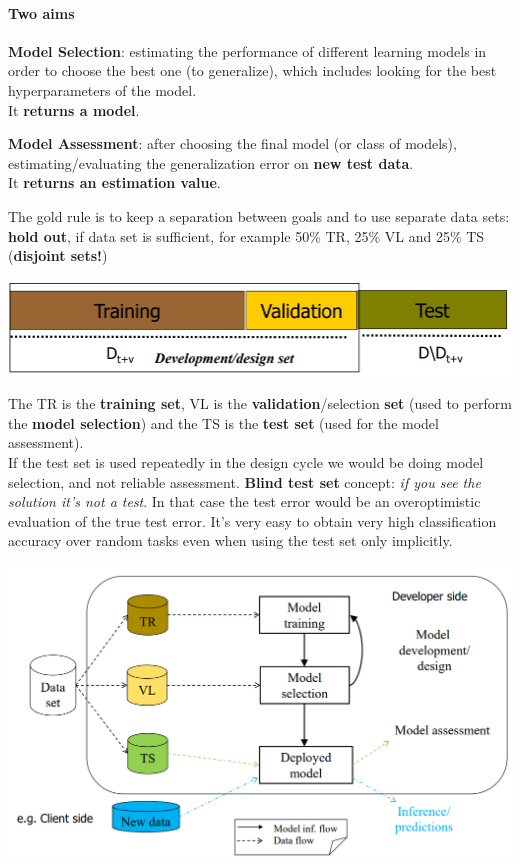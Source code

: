 \documentclass[10pt]{report}
\begin{document}
\paragraph{Two aims} \begin{list}{}{}
	\item \textbf{Model Selection}: estimating the performance of different learning models in order to choose the best one (to generalize), which includes looking for the best hyperparameters of the model.\\
	It \textbf{returns a model}.
	\item \textbf{Model Assessment}: after choosing the final model (or class of models), estimating/evaluating the generalization error on \textbf{new test data}.\\
	It \textbf{returns an estimation value}.
\end{list}
The gold rule is to keep a separation between goals and to use separate data sets: \textbf{hold out}, if data set is sufficient, for example 50\% TR, 25\% VL and 25\% TS (\textbf{disjoint sets!})
	\begin{center}
		\includegraphics[scale=0.5]{11.png}
	\end{center}
The TR is the \textbf{training set}, VL is the \textbf{validation}/selection \textbf{set} (used to perform the \textbf{model selection}) and the TS is the \textbf{test set} (used for the model assessment).\\
If the test set is used repeatedly in the design cycle we would be doing model selection, and not reliable assessment. \textbf{Blind test set} concept: \textit{if you see the solution it's not a test}. In that case the test error would be an overoptimistic evaluation of the true test error. It's very easy to obtain very high classification accuracy over random tasks even when using the test set only implicitly.
\begin{center}
	\includegraphics[scale=0.5]{12.png}
\end{center}
\end{document}
